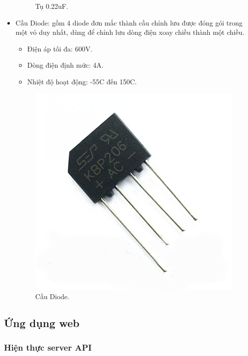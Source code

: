 \documentclass[a4paper,12pt,oneside]{article}
\begin{document}
\begin{itemize}
\begin{figure}[H]
\begin{center}
\end{center}
\caption{Tụ 0.22uF.}
\end{figure}
\item	Cầu Diode: gồm 4 diode đơn mắc thành cầu chỉnh lưu được đóng gói trong một vỏ duy nhất, dùng để chỉnh lưu dòng điện xoay chiều thành một chiều.
	\begin{itemize}
	\item	Điện áp tối đa: 600V.
	\item	Dòng điện định mức: 4A.
	\item	Nhiệt độ hoạt động: -55\textdegree{}C đến 150\textdegree{}C.
	\end{itemize}
\begin{figure}[H]
\centering
\begin{center}
\includegraphics[scale=.3]{hinh/PPM/ppm_caudiode.jpg}
\end{center}
\caption{Cầu Diode.}
\end{figure}
\end{itemize}

\subsection{Ứng dụng web}
\subsubsection{Hiện thực server API}
\end{document}

